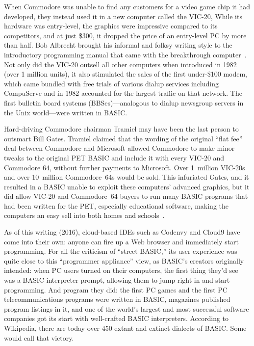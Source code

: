 
When Commodore was unable to find any customers for a video game chip it
had developed, they instead used it in a new computer called the VIC-20,
While its hardware was entry-level, the graphics were impressive
compared to its competitors, and at just \$300, it dropped the price of
an entry-level PC by more than half.
Bob Albrecht brought his informal and folksy writing style to the
introductory programming manual that came with the breakthrough
computer~\cite{commodore}.
Not only did the VIC-20 outsell all other computers when introduced in
1982 (over 1 million units), it also stimulated the sales of the
first under-\$100 modem, which came bundled with free trials of various
dialup services including CompuServe and in 1982 accounted for the
largest traffic on that network.  The first bulletin board systems
(BBSes)---analogous to dialup newsgroup servers in the Unix world---were
written in BASIC.

\begin{tangent}
Hard-driving Commodore chairman Tramiel may have been the last person to
outsmart Bill Gates.  Tramiel claimed that the wording of the
original ``flat fee'' deal between Commodore and Microsoft allowed
Commodore to make minor tweaks to the original PET BASIC and include it
with every VIC-20 and Commodore 64, without further payments to
Microsoft.
Over 1~million VIC-20s and over 10~million Commodore~64s would be sold.
This infuriated Gates, and it resulted in a BASIC unable to exploit
these computers' advanced graphics, but it did allow VIC-20 and
Commodore~64 buyers to run many BASIC programs that had been written
for the PET, especially educational software, making the computers an
easy sell into both homes and schools~\cite[p. 414]{commodore}.

\end{tangent}

As of this writing (2016), cloud-based IDEs such as Codenvy and Cloud9
have come into their own: anyone can fire up a Web browser and
immediately start programming.
For all the criticism of ``street BASIC,'' its user experience was quite
close to this ``programmer appliance'' view, as BASIC's creators
originally intended: when PC users turned on their computers, the first
thing they'd see was a BASIC interpreter prompt, allowing them to jump
right in and start programming.
And program they did: the first PC games and the first PC
telecommunications programs were written in BASIC, magazines published
program listings in it, and one of the world's largest and most
successful software companies got its start with well-crafted BASIC
interpreters.
According to Wikipedia, there are today over 450 extant and extinct
dialects of BASIC.
Some would call that victory.
